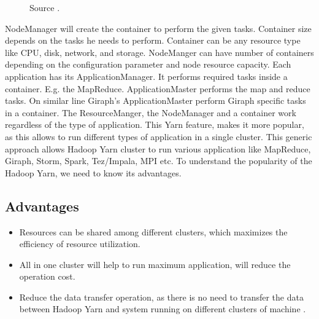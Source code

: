 \documentclass[9pt,twocolumn,twoside]{../../styles/osajnl}
\begin{document}
\begin{figure}[htbp]
	\centering
	\caption{Source \cite{www-1}. }
	\label{fig:false-color}
\end{figure}
NodeManager will create the container to perform the given tasks. Container size depends on the tasks he needs to perform. Container can be any resource type like CPU, disk, network, and storage. NodeManger can have number of containers depending on the configuration parameter and node resource capacity.
Each application has its ApplicationManager. It performs required tasks inside a container. E.g. the MapReduce. ApplicationMaster performs the map and reduce tasks. On similar line Giraph’s ApplicationMaster perform Giraph specific tasks in a container. The ResourceManger, the NodeManager and a container work regardless of the type of application. This Yarn feature, makes it more popular, as this allows to run different types of application in a single cluster. This generic approach allows Hadoop Yarn cluster to run various application like MapReduce, Giraph, Storm, Spark, Tez/Impala, MPI etc. To understand the popularity of the Hadoop Yarn, we need to know its advantages.

\subsection{Advantages}
\begin{itemize}
	\item Resources can be shared among different clusters, which maximizes the efficiency of resource utilization.
	\item All in one cluster will help to run maximum application, will reduce the operation cost.
	\item Reduce the data transfer operation, as there is no need to transfer the data between Hadoop Yarn and system running on different clusters of machine \cite{www-4}.
\end{itemize}
\end{document}
